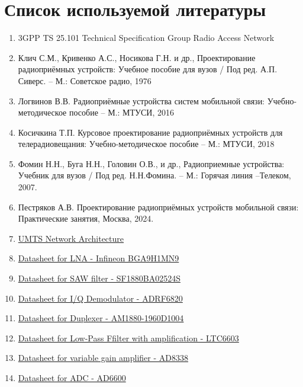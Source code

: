 \documentclass[a4paper,12pt]{article}
\begin{document}
\section{Список используемой литературы}
\begin{enumerate}

\item 	3GPP TS 25.101 Technical Specification Group Radio Access Network
\item  Клич С.М., Кривенко А.С., Носикова Г.Н. и др., Проектирование радиоприёмных устройств: Учебное пособие для вузов / Под ред. А.П. Сиверс. –  М.: Советское радио, 1976 
\item  Логвинов В.В. Радиоприёмные устройства систем мобильной связи: Учебно-методическое пособие – М.: МТУСИ, 2016
\item  Косичкина Т.П. Курсовое проектирование радиоприёмных устройств для телерадиовещания: Учебно-методическое пособие – М.: МТУСИ, 2018
\item  Фомин Н.Н., Буга Н.Н., Головин О.В., и др., Радиоприемные устройства: Учебник для вузов / Под ред. Н.Н.Фомина. – М.: Горячая линия –Телеком, 2007.
\item  Пестряков А.В. Проектирование радиоприёмных устройств мобильной связи: Практические занятия, Москва, 2024.

\item  \href{https://en.lntwww.de/Examples_of_Communication_Systems/UMTS_Network_Architecture?utm_source=chatgpt.com}{UMTS Network Architecture}

\item  \href{https://www.alldatasheet.com/datasheet-pdf/view/1418778/INFINEON/BGA9H1MN9.html}{Datasheet for LNA - Infineon BGA9H1MN9}

\item  \href{https://www.alldatasheet.com/datasheet-pdf/view/565351/APITECH/SF1880BA02524S.html}{Datasheet for SAW filter - SF1880BA02524S}

\item  \href{https://www.alldatasheet.com/html-pdf/902731/AD/ADRF6820ACPZ-R7/70/2/ADRF6820ACPZ-R7.html}{Datasheet for I/Q Demodulator  - ADRF6820}


\item  \href{https://www.everythingrf.com/products/duplexers/anatech-electronics/690-30-am1880-1960d1004}{Datasheet for Duplexer   - AM1880-1960D1004}


\item  \href{https://www.alldatasheet.com/html-pdf/265342/LINER/LTC6603/306/2/LTC6603.html}{Datasheet for Low-Pass Ffilter with amplification - LTC6603}


\item  \href{https://www.alldatasheet.com/datasheet-pdf/view/513439/AD/AD8338.html}{Datasheet for variable gain amplifier - AD8338}

\item  \href{https://www.alldatasheet.com/datasheet-pdf/view/48122/AD/AD6600.html}{Datasheet for ADC - AD6600}



\end{enumerate}
\end{document}
